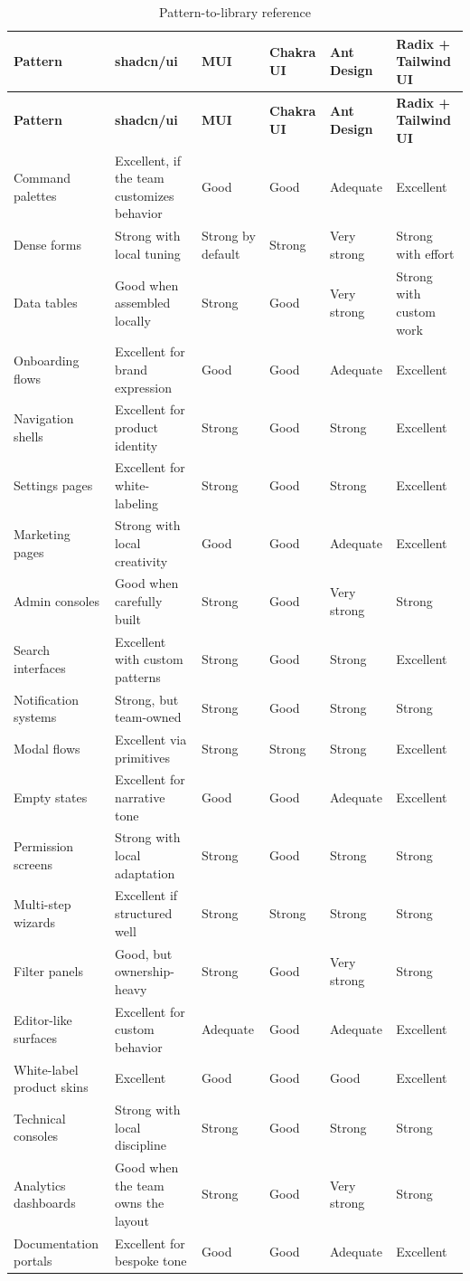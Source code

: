 \documentclass[11pt,twoside,a4paper]{article}
\begin{document}
\begin{longtable}{@{}p{}p{}p{}p{}p{}p{}@{}}
\caption{Pattern-to-library reference}\label{tab:patternreference}\\
\toprule
\textbf{Pattern} & \textbf{shadcn/ui} & \textbf{MUI} & \textbf{Chakra UI} & \textbf{Ant Design} & \textbf{Radix + Tailwind UI} \\
\midrule
\endfirsthead
\toprule
\textbf{Pattern} & \textbf{shadcn/ui} & \textbf{MUI} & \textbf{Chakra UI} & \textbf{Ant Design} & \textbf{Radix + Tailwind UI} \\
\midrule
\endhead
\bottomrule
\endfoot
Command palettes & Excellent, if the team customizes behavior & Good & Good & Adequate & Excellent \\
Dense forms & Strong with local tuning & Strong by default & Strong & Very strong & Strong with effort \\
Data tables & Good when assembled locally & Strong & Good & Very strong & Strong with custom work \\
Onboarding flows & Excellent for brand expression & Good & Good & Adequate & Excellent \\
Navigation shells & Excellent for product identity & Strong & Good & Strong & Excellent \\
Settings pages & Excellent for white-labeling & Strong & Good & Strong & Excellent \\
Marketing pages & Strong with local creativity & Good & Good & Adequate & Excellent \\
Admin consoles & Good when carefully built & Strong & Good & Very strong & Strong \\
Search interfaces & Excellent with custom patterns & Strong & Good & Strong & Excellent \\
Notification systems & Strong, but team-owned & Strong & Good & Strong & Strong \\
Modal flows & Excellent via primitives & Strong & Strong & Strong & Excellent \\
Empty states & Excellent for narrative tone & Good & Good & Adequate & Excellent \\
Permission screens & Strong with local adaptation & Strong & Good & Strong & Strong \\
Multi-step wizards & Excellent if structured well & Strong & Strong & Strong & Strong \\
Filter panels & Good, but ownership-heavy & Strong & Good & Very strong & Strong \\
Editor-like surfaces & Excellent for custom behavior & Adequate & Good & Adequate & Excellent \\
White-label product skins & Excellent & Good & Good & Good & Excellent \\
Technical consoles & Strong with local discipline & Strong & Good & Strong & Strong \\
Analytics dashboards & Good when the team owns the layout & Strong & Good & Very strong & Strong \\
Documentation portals & Excellent for bespoke tone & Good & Good & Adequate & Excellent \\
\end{longtable}
\end{document}
